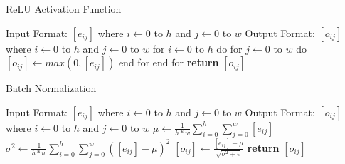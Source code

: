 \documentclass[10pt]{article}
\begin{document}
\begin{algorithm}[H]
\caption{ReLU Activation Function}
    \begin{algorithmic}[4]
          \State Input Format: $[e_{ij}]$ where $i \gets 0$ to $h$ and $j \gets 0$ to $w$
          \State 
          \State Output Format: $[o_{ij}]$ where $i \gets 0$ to $h$ and $j \gets 0$ to $w$
          \State
          \State for $i \gets 0$ to $h$ do
          \State \hspace{1cm} for $j \gets 0$ to $w$ do
          \State \hspace{2cm} $[o_{ij}] \gets max(0, [e_{ij}])$ 
          \State \hspace{1cm} end for
          \State end for
          \State \textbf{return} $[o_{ij}]$ 
    \EndProcedure
    \end{algorithmic}
    
\end{algorithm}

\begin{algorithm}[H]
  \caption{Batch Normalization}
      \begin{algorithmic}[4]
          \State Input Format: $[e_{ij}]$ where $i \gets 0$ to $h$ and $j \gets 0$ to $w$
          \State
          \State Output Format: $[o_{ij}]$ where $i \gets 0$ to $h$ and $j \gets 0$ to $w$
          \State
          \State $\mu \gets \frac{1}{h*w} \sum_{i=0}^{h} \sum_{j=0}^{w} [e_{ij}]$ 
          \State $\sigma^2 \gets \frac{1}{h*w} \sum_{i=0}^{h} \sum_{j=0}^{w} ([e_{ij}] - \mu)^2$ 
          \State $[o_{ij}] \gets \frac{[e_{ij}] - \mu}{\sqrt{\sigma^2 + \epsilon}}$ 
          \State \textbf{return} $[o_{ij}]$ 
      \EndProcedure
      \end{algorithmic}
      
  \end{algorithm}
\end{document}
